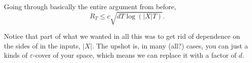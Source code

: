 \documentclass[12pt]{article}
\begin{document}
Going through basically the entire argument from before,
\[R_T\le c\sqrt{dT\log(|X|T)}.\]
\begin{rmk}
	Notice that part of what we wanted in all this was to get rid of dependence on the sides of in the inputs, $|X|$. The upshot is, in many (all?) cases, you can just a kinds of $\varepsilon$-cover of your space, which means we can replace it with a factor of $d$.
\end{rmk}
\end{document}

